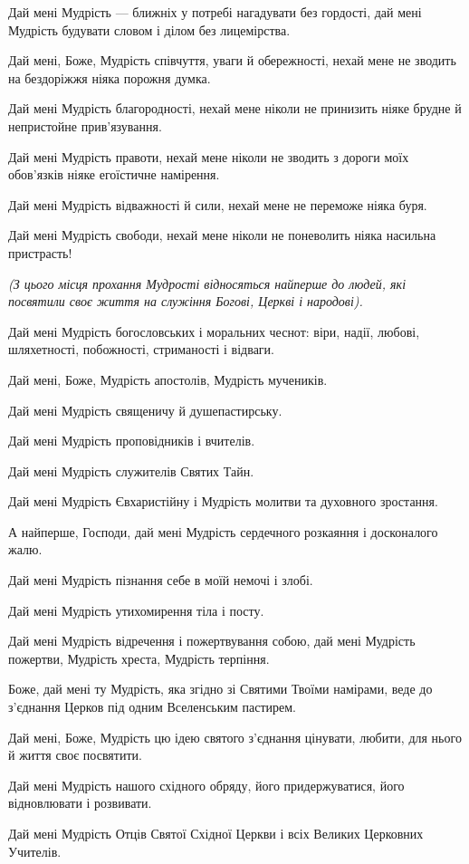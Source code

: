\documentclass[chapters.tex]{subfiles}
\begin{document}
Дай мені Мудрість — ближніх у потребі нагадувати без гордості, дай мені Мудрість будувати словом і ділом без лицемірства.

Дай мені, Боже, Мудрість співчуття, уваги й обережності, нехай мене не зводить на бездоріжжя ніяка порожня думка.

Дай мені Мудрість благородності, нехай мене ніколи не принизить ніяке брудне й непристойне прив’язування.

Дай мені Мудрість правоти, нехай мене ніколи не зводить з дороги моїх обов’язків ніяке егоїстичне намірення.

Дай мені Мудрість відважності й сили, нехай мене не переможе ніяка буря.

Дай мені Мудрість свободи, нехай мене ніколи не поневолить ніяка насильна пристрасть!

\emph{(З цього місця прохання Мудрості відносяться найперше до людей, які посвятили своє життя на служіння Богові, Церкві і народові).}

Дай мені Мудрість богословських і моральних чеснот: віри, надії, любові, шляхетності, побожності, стриманості і відваги.

Дай мені, Боже, Мудрість апостолів, Мудрість мучеників.

Дай мені Мудрість священичу й душепастирську.

Дай мені Мудрість проповідників і вчителів.

Дай мені Мудрість служителів Святих Тайн.

Дай мені Мудрість Євхаристійну і Мудрість молитви та духовного зростання.

А найперше, Господи, дай мені Мудрість сердечного розкаяння і досконалого жалю.

Дай мені Мудрість пізнання себе в моїй немочі і злобі.

Дай мені Мудрість утихомирення тіла і посту.

Дай мені Мудрість відречення і пожертвування собою, дай мені Мудрість пожертви, Мудрість хреста, Мудрість терпіння.

Боже, дай мені ту Мудрість, яка згідно зі Святими Твоїми намірами, веде до з’єднання Церков під одним Вселенським пастирем.

Дай мені, Боже, Мудрість цю ідею святого з’єднання цінувати, любити, для нього й життя своє посвятити.

Дай мені Мудрість нашого східного обряду, його придержуватися, його відновлювати і розвивати.

Дай мені Мудрість Отців Святої Східної Церкви і всіх Великих Церковних Учителів.
\end{document}
